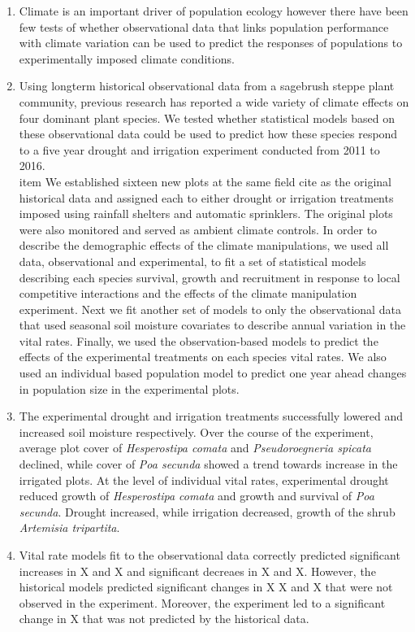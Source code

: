 \documentclass[11pt]{article}
\begin{document}
\begin{doublespacing}
\begin{enumerate}
\item Climate is an important driver of population ecology however there have been few tests of whether observational data that links population performance with climate variation can be used to predict the responses of populations to experimentally imposed climate conditions.   
\item Using longterm historical observational data from a sagebrush steppe plant community, previous research has reported a wide variety of climate effects on four dominant plant species. We tested whether statistical models based on these observational data could be used to predict how these species respond to a five year drought and irrigation experiment conducted from 2011 to 2016. 
\\item We established sixteen new plots at the same field cite as the original historical data and assigned each to either drought or irrigation treatments imposed using rainfall shelters and automatic sprinklers. The original plots were also monitored and served as ambient climate controls. In order to describe the demographic effects of the climate manipulations, we used all data, observational and experimental, to fit a set of statistical models describing each species survival, growth and recruitment in response to local competitive interactions and the effects of the climate manipulation experiment. Next we fit another set of models to only the observational data that used seasonal soil moisture covariates to describe annual variation in the vital rates.  Finally, we used the observation-based models to predict the effects of the experimental treatments on each species vital rates. We also used an individual based population model to predict one year ahead changes in population size in the experimental plots.   
\item The experimental drought and irrigation treatments successfully lowered and increased soil moisture respectively.  Over the course of the experiment, average plot cover of \textit{Hesperostipa comata} and \textit{Pseudoroegneria spicata} declined, while cover of \textit{Poa secunda} showed a trend towards increase in the irrigated plots. At the level of individual vital rates, experimental drought reduced growth of \textit{Hesperostipa comata} and growth and survival of \textit{Poa secunda}. Drought increased, while irrigation decreased, growth of the shrub \textit{Artemisia tripartita}. 
\item Vital rate models fit to the observational data correctly predicted significant increases in X and X and significant decreaes in X and X.  However, the historical models predicted significant changes in X X and X that were not observed in the experiment.  Moreover, the experiment led to a significant change in X that was not predicted by the historical data. 

\end{enumerate}
\end{doublespacing}
\end{document}
